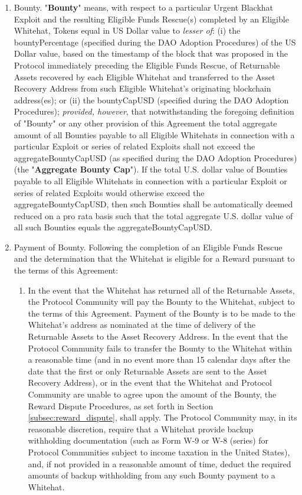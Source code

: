 \documentclass{article}
\begin{document}
\begin{enumerate}


    \item Bounty. "\textbf{Bounty}" means, with respect to a particular Urgent Blackhat Exploit and the resulting Eligible Funds Rescue(s) completed by an Eligible Whitehat, Tokens equal in US Dollar value to \textit{lesser of}: (i) the bountyPercentage (specified during the DAO Adoption Procedures) of the US Dollar value, based on the timestamp of the block that was proposed in the Protocol immediately preceding the Eligible Funds Rescue, of Returnable Assets recovered by each Eligible Whitehat and transferred to the Asset Recovery Address from such Eligible Whitehat's originating blockchain address(es); or (ii) the bountyCapUSD (specified during the DAO Adoption Procedures); \textit{provided, however}, that notwithstanding the foregoing definition of "Bounty" or any other provision of this Agreement the total aggregate amount of all Bounties payable to all Eligible Whitehats in connection with a particular Exploit or series of related Exploits shall not exceed the aggregateBountyCapUSD (as specified during the DAO Adoption Procedures) (the "\textbf{Aggregate Bounty Cap}"). If the total U.S. dollar value of Bounties payable to all Eligible Whitehats in connection with a particular Exploit or series of related Exploits would otherwise exceed the aggregateBountyCapUSD, then such Bounties shall be automatically deemed reduced on a pro rata basis such that the total aggregate U.S. dollar value of all such Bounties equals the aggregateBountyCapUSD.

    \item Payment of Bounty. Following the completion of an Eligible Funds Rescue and the determination that the Whitehat is eligible for a Reward pursuant to the terms of this Agreement:

          \begin{enumerate}

              \item In the event that the Whitehat has returned all of the Returnable Assets, the Protocol Community will pay the Bounty to the Whitehat, subject to the terms of this Agreement. Payment of the Bounty is to be made to the Whitehat's address as nominated at the time of delivery of the Returnable Assets to the Asset Recovery Address. In the event that the Protocol Community fails to transfer the Bounty to the Whitehat within a reasonable time (and in no event more than 15 calendar days after the date that the first or only Returnable Assets are sent to the Asset Recovery Address), or in the event that the Whitehat and Protocol Community are unable to agree upon the amount of the Bounty, the Reward Dispute Procedures, as set forth in Section \ref{subsec:reward_dispute}, shall apply. The Protocol Community may, in its reasonable discretion, require that a Whitehat provide backup withholding documentation (such as Form W-9 or W-8 (series) for Protocol Communities subject to income taxation in the United States), and, if not provided in a reasonable amount of time, deduct the required amounts of backup withholding from any such Bounty payment to a Whitehat.


\end{enumerate}
\end{enumerate}
\end{document}
